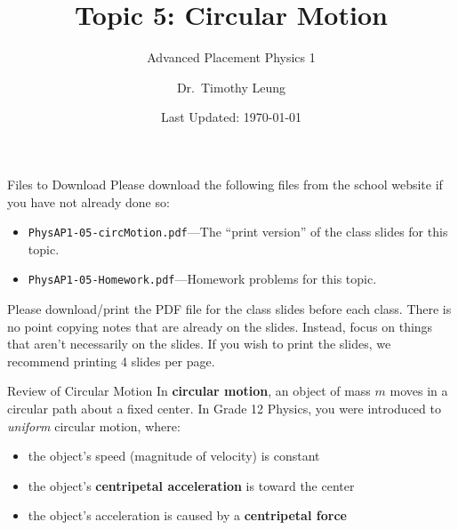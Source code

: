 \documentclass[12pt,compress,aspectratio=169]{beamer}
\title{Topic 5: Circular Motion}
\subtitle{Advanced Placement Physics 1}
\author[TML]{Dr.\ Timothy Leung}
\institute{Olympiads School}
\date{Last Updated: \today}
\begin{document}
\begin{frame}
  \maketitle
\end{frame}


\begin{frame}{Files to Download}
  Please download the following files from the school website if you have not
  already done so:
  \begin{itemize}
  \item\texttt{PhysAP1-05-circMotion.pdf}---The ``print version'' of the
    class slides for this topic.
  \item\texttt{PhysAP1-05-Homework.pdf}---Homework problems for this topic.
  \end{itemize}
  \vspace{.1in}Please download/print the PDF file for the class slides before
  each class. There is no point copying notes that are already on the slides.
  Instead, focus on things that aren't necessarily on the slides. If you wish
  to print the slides, we recommend printing 4 slides per page.
\end{frame}



\begin{frame}{Review of Circular Motion}
  In \textbf{circular motion}, an object of mass $m$ moves in a circular path
  about a fixed center. In Grade 12 Physics, you were introduced to
  \emph{uniform} circular motion, where:
  \begin{itemize}
  \item the object's speed (magnitude of velocity) is constant
  \item the object's \textbf{centripetal acceleration} is toward the center
  \item the object's acceleration is caused by a \textbf{centripetal force}
  \end{itemize}
\end{frame}
\end{document}
